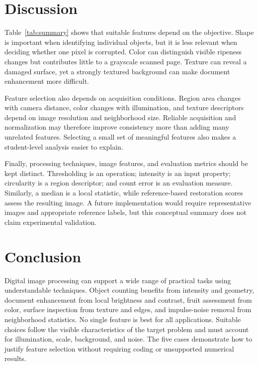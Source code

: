 \documentclass[conference]{IEEEtran}
\begin{document}
\section{Discussion}
Table~\ref{tab:summary} shows that suitable features depend on the objective. Shape is important when identifying individual objects, but it is less relevant when deciding whether one pixel is corrupted. Color can distinguish visible ripeness changes but contributes little to a grayscale scanned page. Texture can reveal a damaged surface, yet a strongly textured background can make document enhancement more difficult.

Feature selection also depends on acquisition conditions. Region area changes with camera distance, color changes with illumination, and texture descriptors depend on image resolution and neighborhood size. Reliable acquisition and normalization may therefore improve consistency more than adding many unrelated features. Selecting a small set of meaningful features also makes a student-level analysis easier to explain.

Finally, processing techniques, image features, and evaluation metrics should be kept distinct. Thresholding is an operation; intensity is an input property; circularity is a region descriptor; and count error is an evaluation measure. Similarly, a median is a local statistic, while reference-based restoration scores assess the resulting image. A future implementation would require representative images and appropriate reference labels, but this conceptual summary does not claim experimental validation.

\section{Conclusion}
Digital image processing can support a wide range of practical tasks using understandable techniques. Object counting benefits from intensity and geometry, document enhancement from local brightness and contrast, fruit assessment from color, surface inspection from texture and edges, and impulse-noise removal from neighborhood statistics. No single feature is best for all applications. Suitable choices follow the visible characteristics of the target problem and must account for illumination, scale, background, and noise. The five cases demonstrate how to justify feature selection without requiring coding or unsupported numerical results.



\end{document}
